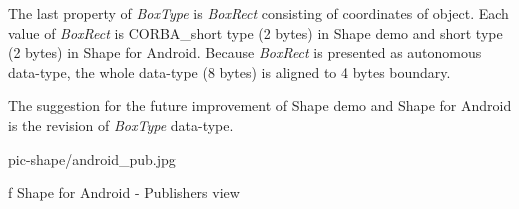 The last property of {\em BoxType} is {\em BoxRect} consisting of coordinates of object. Each value of {\em BoxRect} is CORBA\_short type (2 bytes) in Shape demo and short type (2 bytes) in Shape for Android. Because {\em BoxRect} is presented as  autonomous data-type, the whole data-type (8 bytes) is aligned to 4 bytes boundary.

The suggestion for the future improvement of Shape demo and Shape for Android is the revision of {\em BoxType} data-type.

\midinsert
\picw=14cm \cinspic pic-shape/android_pub.jpg
\caption/f Shape for Android - Publishers view
\endinsert

